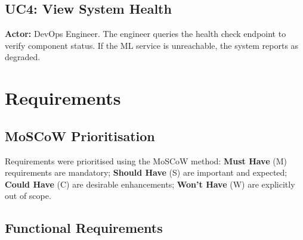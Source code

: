 \subsection{UC4: View System Health}
\textbf{Actor:} DevOps Engineer.
The engineer queries the health check endpoint to verify component status. If the ML service is unreachable, the system reports as degraded.

\section{Requirements}

\subsection{MoSCoW Prioritisation}
Requirements were prioritised using the MoSCoW method: \textbf{Must Have} (M) requirements are mandatory; \textbf{Should Have} (S) are important and expected; \textbf{Could Have} (C) are desirable enhancements; \textbf{Won't Have} (W) are explicitly out of scope.

\subsection{Functional Requirements}

\renewcommand{\arraystretch}{1.3}

